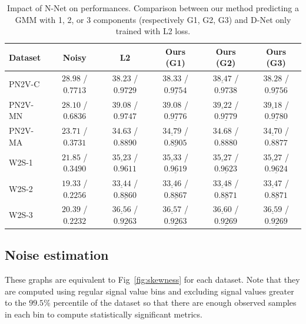 \documentclass{article}
\begin{document}
\begin{table}[ht]
\caption{Impact of N-Net on performances. Comparison between our method predicting a GMM with 1, 2, or 3 components (respectively G1, G2, G3) and D-Net only trained with L2 loss.}
\label{si:table:results}
\begin{center}
\begin{sc}
\begin{tabular}{lccccc}
\toprule
Dataset & Noisy & L2 & Ours (G1) & Ours (G2) & Ours (G3) \\
\midrule
PN2V-C & $28.98$ / $0.7713$ & $38.23$ / $0.9729$ & $38.33$ / $\underline{0.9754}$ & $\underline{38.47}$ / $0.9738$ & $38.28$ / $\underline{0.9756}$ \\
PN2V-MN & $28.10$ / $0.6836$ & $39.08$ / $0.9747$ & $39.08$ / $\underline{0.9776}$ & $\underline{39.22}$ / $\underline{0.9779}$ & $\underline{39.18}$ / $\underline{0.9780}$ \\
PN2V-MA & $23.71$ / $0.3731$ & $34.63$ / $0.8890$ & $\underline{34.79}$ / $\underline{0.8905}$ & $34.68$ / $0.8880$ & $\underline{34.70}$ / $0.8877$ \\
W2S-1 & $21.85$ / $0.3490$ & $\underline{35.23}$ / $0.9611$ & $\underline{35.33}$ / $\underline{0.9619}$ & $\underline{35.27}$ / $\underline{0.9623}$ & $\underline{35.27}$ / $\underline{0.9624}$ \\
W2S-2 & $19.33$ / $0.2256$ & $\underline{33.44}$ / $\underline{0.8860}$ & $\underline{33.46}$ / $\underline{0.8867}$ & $\underline{33.48}$ / $\underline{0.8871}$ & $\underline{33.47}$ / $\underline{0.8871}$ \\
W2S-3 & $20.39$ / $0.2232$ & $\underline{36.56}$ / $\underline{0.9263}$ & $\underline{36.57}$ / $\underline{0.9263}$ & $\underline{36.60}$ / $\underline{0.9269}$ & $\underline{36.59}$ / $\underline{0.9269}$ \\
\bottomrule
\end{tabular}
\end{sc}
\end{center}
\end{table}
\FloatBarrier
\subsection{Noise estimation}
\label{si:skewness}
These graphs are equivalent to Fig~\ref{fig:skewness} for each dataset.
Note that they are computed using regular signal value bins and excluding signal values greater to the $99.5\%$ percentile of the dataset so that there are enough observed samples in each bin to compute statistically significant metrics.
\end{document}
